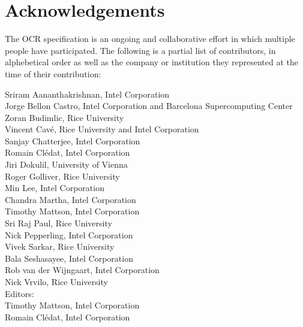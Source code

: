 \chapter*{Acknowledgements}
The OCR specification is an ongoing and collaborative effort in which
multiple people have participated. The following is a partial list of
contributors, in alphebetical order as well as the company or
institution they represented at the time of their contribution:

Sriram Aananthakrishnan, Intel Corporation\\
Jorge Bellon Castro, Intel Corporation and Barcelona Supercomputing Center\\
Zoran Budimlic, Rice University\\
Vincent Cav\'e, Rice University and Intel Corporation\\
Sanjay Chatterjee, Intel Corporation\\
Romain Cl\'edat, Intel Corporation\\
Jiri Dokulil, University of Vienna\\
Roger Golliver, Rice University\\
Min Lee, Intel Corporation\\
Chandra Martha, Intel Corporation\\
Timothy Mattson, Intel Corporation\\
Sri Raj Paul, Rice University\\
Nick Pepperling, Intel Corporation\\
Vivek Sarkar, Rice University\\
Bala Seshasayee, Intel Corporation\\
Rob van der Wijngaart, Intel Corporation\\
Nick Vrvilo, Rice University\\

Editors:\\
Timothy Mattson, Intel Corporation\\
Romain Cl\'edat, Intel Corporation\\
